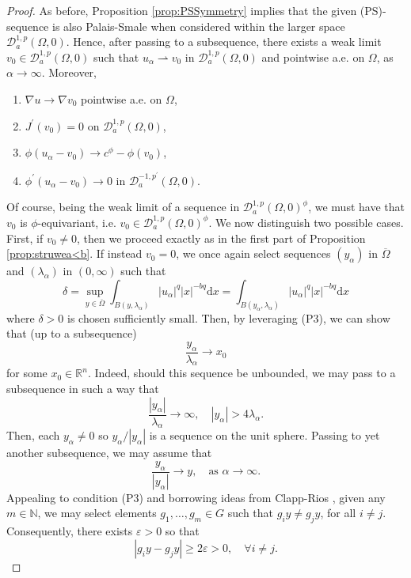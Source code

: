 \documentclass[10pt, reqno]{amsart}
\newcommand{\NN}{\mathbb{N}}
\newcommand{\RR}{\mathbb{R}}
\newcommand{\Om}{\Omega}
\newcommand{\abs}[1]{\left\vert #1 \right\vert}
\newcommand{\D}{\mathcal{D}}
\renewcommand{\d}{\mathrm{d}}
\renewcommand{\epsilon}{\varepsilon}
\numberwithin{equation}{section}
\theoremstyle{definition}
\theoremstyle{remark}
\theoremstyle{plain}
\begin{document}
	\begin{proof} As before, Proposition \ref{prop:PSSymmetry} implies that the given (PS)-sequence is also Palais-Smale when considered within the larger space $\D_a^{1,p}(\Om,0)$. Hence, after passing to a subsequence, there exists a weak limit $v_0 \in \D_a^{1,p} (\Om,0)$ such that $u_\alpha \rightharpoonup v_0$ in $\D_a^{1,p} (\Om,0)$ and pointwise a.e. on $\Om$, as $\alpha \to \infty$. Moreover,
		\begin{enumerate}
			\item $\nabla u \to \nabla v_0$ pointwise a.e. on $\Om$,
			\item $J^\prime(v_0) = 0$ on $\D_a^{1,p}(\Om, 0)$,
			\item $\phi(u_\alpha - v_0) \to c^\phi - \phi(v_0)$,
			\item $\phi^\prime(u_\alpha - v_0) \to 0$ in $\D_a^{-1,p^\prime}(\Om,0)$.
		\end{enumerate}
		Of course, being the weak limit of a sequence in $\D_a^{1,p}(\Om,0)^\phi$, we must have that $v_0$ is $\phi$-equivariant, i.e. $v_0 \in \D_a^{1,p}(\Om,0)^\phi$. 
		We now distinguish two possible cases. First, if $v_0 \ne 0$, then we proceed exactly as in the first part of Proposition \ref{prop:struwea<b}. If instead $v_0 = 0$, we once again select sequences $(y_\alpha)$ in $\overline{\Om}$ and $(\lambda_\alpha)$ in $(0, \infty)$ such that
		\[
		\delta = \sup_{y\in\overline{\Om}}\int_{B(y, \lambda_\alpha)}\abs{u_\alpha}^q\abs{x}^{-bq}\d{x} = \int_{B(y_\alpha, \lambda_\alpha)}\abs{u_\alpha}^q\abs{x}^{-bq}\d{x}
		\]
		where $\delta > 0$ is chosen sufficiently small. Then, by leveraging (P3), we can show that (up to a subsequence)
		\begin{equation}\label{eq:psPropeq1}
			\frac{y_\alpha}{\lambda_\alpha} \to x_0
		\end{equation}
		for some $x_0\in\RR^n$. Indeed, should this sequence be unbounded, we may pass to a subsequence in such a way that
		\[
		\frac{\abs{y_\alpha}}{\lambda_\alpha} \to \infty, \quad \abs{y_\alpha} > 4\lambda_\alpha.
		\]
		Then, each $y_\alpha \ne 0$ so $y_\alpha/\abs{y_\alpha}$ is a sequence on the unit sphere. Passing to yet another subsequence, we may assume that
		\[
		\frac{y_\alpha}{\abs{y_\alpha}} \to y, \quad \text{as $\alpha \to \infty$}.
		\]
		Appealing to condition (P3) and borrowing ideas from Clapp-Rios \cite{clappRios},
		given any $m \in \NN$, we may select elements $g_1,\dots,g_m \in G$ such that $g_i y \ne g_j y$, for all $i \ne j$. Consequently, there exists $\epsilon > 0$ so that
		\[
		\abs{g_i y - g_j y} \ge 2\epsilon > 0, \quad \forall i \ne j.
\]
\end{proof}
\end{document}
